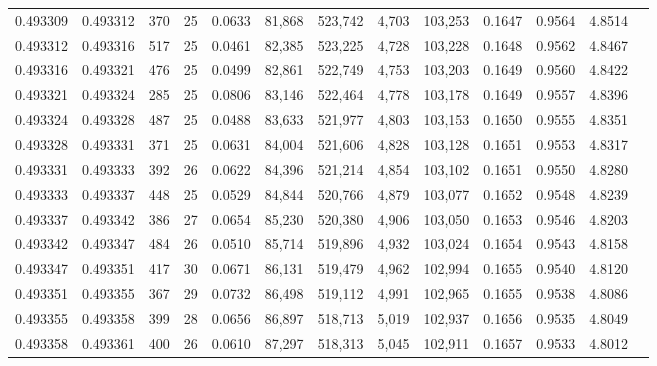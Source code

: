 \begin{tabular}{rrrrrrrrrrrrr}
0.493309 & 0.493312 & 370 &  25 &                                     0.0633 &  81,868 & 523,742 &   4,703 & 103,253 & 0.1647 & 0.9564 & 4.8514 \\
0.493312 & 0.493316 & 517 &  25 &                                     0.0461 &  82,385 & 523,225 &   4,728 & 103,228 & 0.1648 & 0.9562 & 4.8467 \\
0.493316 & 0.493321 & 476 &  25 &                                     0.0499 &  82,861 & 522,749 &   4,753 & 103,203 & 0.1649 & 0.9560 & 4.8422 \\
0.493321 & 0.493324 & 285 &  25 &                                     0.0806 &  83,146 & 522,464 &   4,778 & 103,178 & 0.1649 & 0.9557 & 4.8396 \\
0.493324 & 0.493328 & 487 &  25 &                                     0.0488 &  83,633 & 521,977 &   4,803 & 103,153 & 0.1650 & 0.9555 & 4.8351 \\
0.493328 & 0.493331 & 371 &  25 &                                     0.0631 &  84,004 & 521,606 &   4,828 & 103,128 & 0.1651 & 0.9553 & 4.8317 \\
0.493331 & 0.493333 & 392 &  26 &                                     0.0622 &  84,396 & 521,214 &   4,854 & 103,102 & 0.1651 & 0.9550 & 4.8280 \\
0.493333 & 0.493337 & 448 &  25 &                                     0.0529 &  84,844 & 520,766 &   4,879 & 103,077 & 0.1652 & 0.9548 & 4.8239 \\
0.493337 & 0.493342 & 386 &  27 &                                     0.0654 &  85,230 & 520,380 &   4,906 & 103,050 & 0.1653 & 0.9546 & 4.8203 \\
0.493342 & 0.493347 & 484 &  26 &                                     0.0510 &  85,714 & 519,896 &   4,932 & 103,024 & 0.1654 & 0.9543 & 4.8158 \\
0.493347 & 0.493351 & 417 &  30 &                                     0.0671 &  86,131 & 519,479 &   4,962 & 102,994 & 0.1655 & 0.9540 & 4.8120 \\
0.493351 & 0.493355 & 367 &  29 &                                     0.0732 &  86,498 & 519,112 &   4,991 & 102,965 & 0.1655 & 0.9538 & 4.8086 \\
0.493355 & 0.493358 & 399 &  28 &                                     0.0656 &  86,897 & 518,713 &   5,019 & 102,937 & 0.1656 & 0.9535 & 4.8049 \\
0.493358 & 0.493361 & 400 &  26 &                                     0.0610 &  87,297 & 518,313 &   5,045 & 102,911 & 0.1657 & 0.9533 & 4.8012 \\

\end{tabular}
